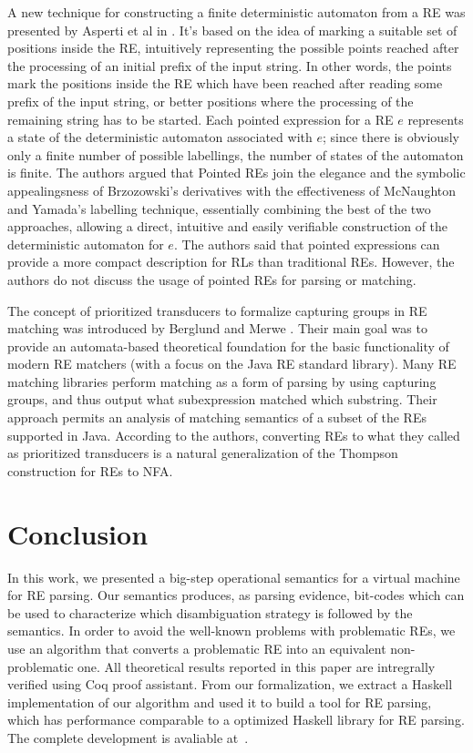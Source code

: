 \documentclass[review]{elsarticle}
\theoremstyle{definition}
\begin{document}
A new technique for constructing a finite deterministic automaton from a 
RE was presented by Asperti et al in \cite{Asperti10}. It's based on the 
idea of marking a suitable set of positions inside the RE, intuitively 
representing the possible points reached after the processing of an initial 
prefix of the input string. In other words, the points mark the positions 
inside the RE which have been reached after reading some prefix of the 
input string, or better positions where the processing of the remaining 
string has to be started. Each pointed expression for a RE $e$ represents 
a state of the deterministic automaton associated with $e$; since there 
is obviously only a finite number of possible labellings, the number 
of states of the automaton is finite. The authors argued that 
Pointed REs join the elegance and the symbolic appealingsness of 
Brzozowski's derivatives with the effectiveness of McNaughton and 
Yamada's labelling technique, essentially combining the best of the 
two approaches, allowing a direct, intuitive and easily verifiable 
construction of the deterministic automaton for $e$. The authors said 
that pointed expressions can provide a more compact description for 
RLs than traditional REs. However, the authors do not discuss the 
usage of pointed REs for parsing or matching.

The concept of prioritized transducers to formalize capturing groups in RE
matching was introduced by Berglund and Merwe \cite{Berglund2016}. Their main
goal was to provide an automata-based theoretical foundation for the basic
functionality of modern RE matchers (with a focus on the Java RE standard
library). Many RE matching libraries perform matching as a form of parsing by 
using capturing groups, and thus output what subexpression matched which
substring. Their approach permits an analysis of matching semantics of a 
subset of the REs supported in Java. According to the authors, converting REs 
to what they called as prioritized transducers is a natural generalization of 
the Thompson construction for REs to NFA.

\section{Conclusion}\label{section:conclusion}

In this work, we presented a big-step operational semantics for a virtual machine for RE parsing. 
Our semantics produces, as parsing evidence, bit-codes which can be used to characterize which
disambiguation strategy is followed by the semantics. In order to avoid the well-known problems with 
problematic REs, we use an algorithm that converts a problematic RE into an equivalent non-problematic one.
All theoretical results reported in this paper are intregrally verified using
Coq proof assistant. 
From our formalization, we extract a Haskell implementation of our algorithm and used it to build 
a tool for RE parsing, which has performance comparable to a optimized Haskell library
for RE parsing. The complete development is avaliable at~\cite{regexvm-rep}.
\end{document}

